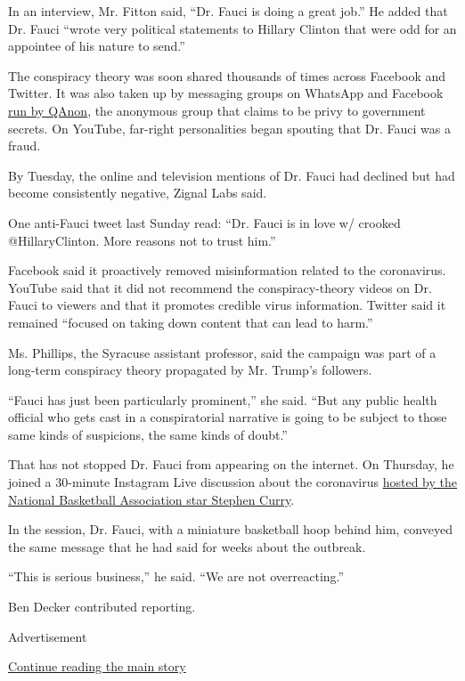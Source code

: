 In an interview, Mr. Fitton said, ``Dr. Fauci is doing a great job.'' He
added that Dr. Fauci ``wrote very political statements to Hillary
Clinton that were odd for an appointee of his nature to send.''

The conspiracy theory was soon shared thousands of times across Facebook
and Twitter. It was also taken up by messaging groups on WhatsApp and
Facebook
\href{https://www.nytimes.com/2020/02/09/us/politics/qanon-trump-conspiracy-theory.html}{run
by QAnon}, the anonymous group that claims to be privy to government
secrets. On YouTube, far-right personalities began spouting that Dr.
Fauci was a fraud.

By Tuesday, the online and television mentions of Dr. Fauci had declined
but had become consistently negative, Zignal Labs said.

One anti-Fauci tweet last Sunday read: ``Dr. Fauci is in love w/ crooked
@HillaryClinton. More reasons not to trust him.''

Facebook said it proactively removed misinformation related to the
coronavirus. YouTube said that it did not recommend the
conspiracy-theory videos on Dr. Fauci to viewers and that it promotes
credible virus information. Twitter said it remained ``focused on taking
down content that can lead to harm.''

Ms. Phillips, the Syracuse assistant professor, said the campaign was
part of a long-term conspiracy theory propagated by Mr. Trump's
followers.

``Fauci has just been particularly prominent,'' she said. ``But any
public health official who gets cast in a conspiratorial narrative is
going to be subject to those same kinds of suspicions, the same kinds of
doubt.''

That has not stopped Dr. Fauci from appearing on the internet. On
Thursday, he joined a 30-minute Instagram Live discussion about the
coronavirus
\href{https://www.nytimes.com/2020/03/26/sports/basketball/coronavirus-stephen-curry-instagram.html}{hosted
by the National Basketball Association star Stephen Curry}.

In the session, Dr. Fauci, with a miniature basketball hoop behind him,
conveyed the same message that he had said for weeks about the outbreak.

``This is serious business,'' he said. ``We are not overreacting.''

Ben Decker contributed reporting.

Advertisement

\protect\hyperlink{after-bottom}{Continue reading the main story}

